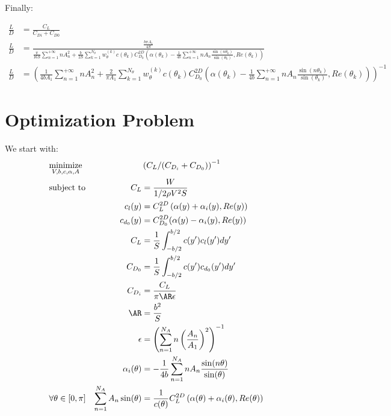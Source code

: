 \documentclass[letterpaper,12pt]{article}
\begin{document}
Finally:

\begin{align}
	\label{eq:ld}
	\frac L D &= \frac {C_L} 
	{C_{Di} + C_{D0}} \nonumber \\
	\frac L D &= \frac{\frac{b \pi A_1}{4S}}{
		\frac {\pi}{16S} \sum_{n=1}^{+\infty} n A_{n}^2 + 
		\frac b {2S} \sum_{k=1}^{N_{\theta}} w_{\theta}^{(k)} c(\theta_k) C_{D_0}^{2D}\left( \alpha(\theta_k) - \frac {1}{4b} \sum_{n=1}^{+\infty} n A_n \frac{ \sin(n\theta_k) }{\sin(\theta_k)} , Re(\theta_k)\right)
	} \nonumber \\
	\frac L D &= \left(	\frac {1}{4bA_1} \sum_{n=1}^{+\infty} n A_{n}^2 + 
		\frac {2} {\pi A_1} \sum_{k=1}^{N_{\theta}} w_{\theta}^{(k)} c(\theta_k) C_{D_0}^{2D}\left( \alpha(\theta_k) - \frac {1}{4b} \sum_{n=1}^{+\infty} n A_n \frac{ \sin(n\theta_k) }{\sin(\theta_k)} , Re(\theta_k)\right) 
	\right)^{-1} 
\end{align}


\section{Optimization Problem}

We start with:
\begin{align*}
	& \underset{V, b, c, \alpha, A}{\text{minimize}}
	& & \left( C_L / (C_{D_i} + C_{D_0})\right)^{-1} \nonumber \\
	& \text{subject to} 
	& C_L &= \frac{W}{1/2 \rho V^2 S} \\
	& & c_l(y) &= C_L^{2D} \left( \alpha(y) + \alpha_i(y), Re(y)\right) \\
	& & c_{d_0}(y) &= C_{D_0}^{2D}(\alpha(y) - \alpha_i(y), Re(y)) \\
	& & C_L &= \frac 1 S \int_{-b/2}^{b/2} c(y') c_l(y') dy'\\
	& & C_{D_0} &= \frac 1 S \int_{-b/2}^{b/2} c(y') c_{d_0}(y') dy'\\
	& & C_{D_i} & = \frac{C_L}{\pi \AR \epsilon} \\
	& & \AR &= \frac{b^2}{S} \\
	& & \epsilon &= \left(\sum_{n=1}^{N_A} n \left(\frac{A_n}{A_1}\right)^2 \right)^{-1} \\
	& & \alpha_i(\theta) &= -\frac 1 {4b} \sum_{n=1}^{N_A} n A_n\frac{\sin(n\theta)}{\sin(\theta)} \\
	& \forall \theta \in [0, \pi] & \sum_{n=1}^{N_A} A_n \sin(\theta) &= \frac{1}{c(\theta)} C_L^{2D} \left( \alpha(\theta) + \alpha_i(\theta), Re(\theta)\right) \\
\end{align*}
\end{document}
